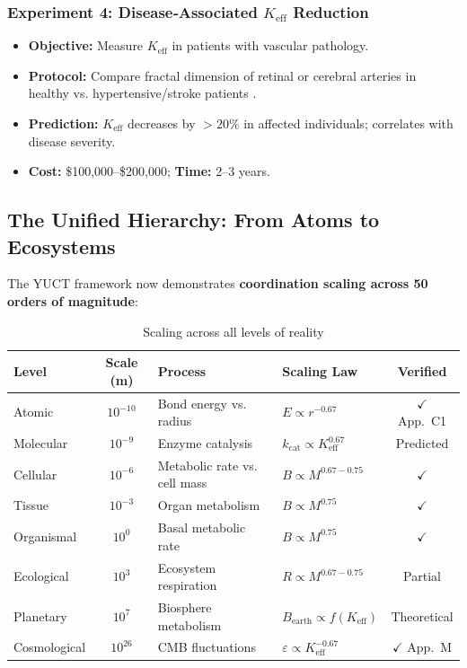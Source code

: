 \documentclass[12pt]{article}
\newcommand{\Keff}{K_{\mathrm{eff}}}
\begin{document}
	\subsubsection{Experiment 4: Disease‑Associated \(\Keff\) Reduction}
	\begin{itemize}
		\item \textbf{Objective:} Measure \(\Keff\) in patients with vascular pathology.
		\item \textbf{Protocol:} Compare fractal dimension of retinal or cerebral arteries in healthy vs. hypertensive/stroke patients \cite{Gould1993}.
		\item \textbf{Prediction:} \(\Keff\) decreases by \(>20\%\) in affected individuals; correlates with disease severity.
		\item \textbf{Cost:} \$100,000–\$200,000; \textbf{Time:} 2–3 years.
	\end{itemize}
	
	\subsection{The Unified Hierarchy: From Atoms to Ecosystems}
	
	The YUCT framework now demonstrates \textbf{coordination scaling across 50 orders of magnitude}:
	
	\begin{table}[htbp]
		\centering
		\caption{Scaling across all levels of reality}
		\label{tab:unified-hierarchy}
		\begin{tabular}{p{3cm} c p{4cm} p{3cm} c}
			\toprule
			\textbf{Level} & \textbf{Scale (m)} & \textbf{Process} & \textbf{Scaling Law} & \textbf{Verified} \\
			\midrule
			Atomic      & \(10^{-10}\) & Bond energy vs. radius & \(E \propto r^{-0.67}\) & $\checkmark$ App.~C1 \\
			Molecular   & \(10^{-9}\)  & Enzyme catalysis        & \(k_{\text{cat}} \propto \Keff^{0.67}\) & Predicted \\
			Cellular    & \(10^{-6}\)  & Metabolic rate vs. cell mass & \(B \propto M^{0.67-0.75}\) & $\checkmark$ \cite{Takemoto2015} \\
			Tissue      & \(10^{-3}\)  & Organ metabolism        & \(B \propto M^{0.75}\) & $\checkmark$ \cite{West2002} \\
			Organismal  & \(10^{0}\)   & Basal metabolic rate    & \(B \propto M^{0.75}\) & $\checkmark$ \cite{Kleiber1932} \\
			Ecological  & \(10^{3}\)   & Ecosystem respiration   & \(R \propto M^{0.67-0.75}\) & Partial \\
			Planetary   & \(10^{7}\)   & Biosphere metabolism    & \(B_{\text{earth}} \propto f(\Keff)\) & Theoretical \\
			Cosmological& \(10^{26}\)  & CMB fluctuations        & \(\varepsilon \propto \Keff^{-0.67}\) & $\checkmark$ App.~M \\
			\bottomrule
		\end{tabular}
	\end{table}
	
\end{document}
